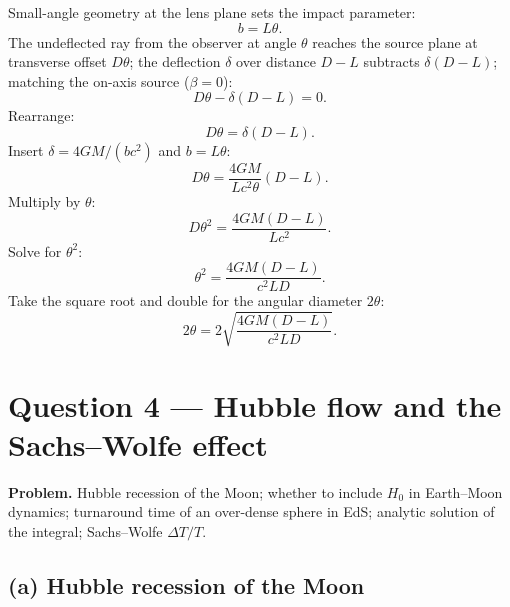 \documentclass[11pt]{article}
\begin{document}
\begin{center}
\end{center}

Small-angle geometry at the lens plane sets the impact parameter:
\[ b=L\theta. \]
The undeflected ray from the observer at angle $\theta$ reaches the source plane at transverse offset $D\theta$; the deflection $\delta$ over distance $D-L$ subtracts $\delta(D-L)$; matching the on-axis source ($\beta=0$):
\[ D\theta-\delta(D-L)=0. \]
Rearrange:
\[ D\theta=\delta(D-L). \]
Insert $\delta=4GM/(bc^2)$ and $b=L\theta$:
\[ D\theta=\frac{4GM}{Lc^2\theta}(D-L). \]
Multiply by $\theta$:
\[ D\theta^2=\frac{4GM(D-L)}{Lc^2}. \]
Solve for $\theta^2$:
\[ \theta^2=\frac{4GM(D-L)}{c^2 LD}. \]
Take the square root and double for the angular diameter $2\theta$:
\begin{equation}
\boxed{\;2\theta=2\sqrt{\frac{4GM(D-L)}{c^2 LD}}.\;}
\label{eq:einstein-ring}
\end{equation}

\section*{Question 4 --- Hubble flow and the Sachs--Wolfe effect}

\textbf{Problem.} Hubble recession of the Moon; whether to include $H_0$ in Earth--Moon dynamics; turnaround time of an over-dense sphere in EdS; analytic solution of the integral; Sachs--Wolfe $\Delta T/T$.

\subsection*{(a) Hubble recession of the Moon}
\end{document}
